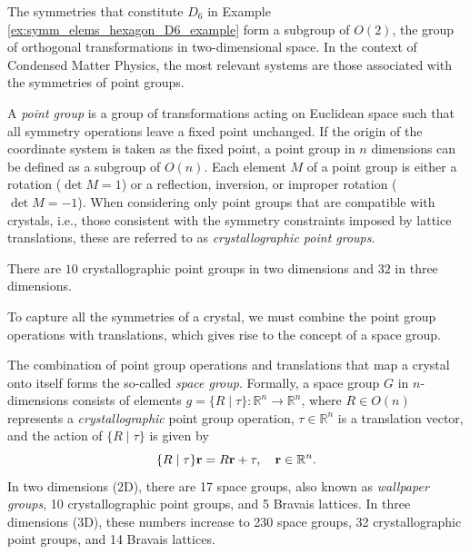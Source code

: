 The symmetries that constitute \(D_6\) in Example \ref{ex:symm_elems_hexagon_D6_example} form a subgroup of \(O(2)\), the group of orthogonal transformations in two-dimensional space. In the context of Condensed Matter Physics, the most relevant systems are those associated with the symmetries of point groups.
\begin{definition} \label{def:point_group}
A \textit{point group} is a group of transformations acting on Euclidean space such that all symmetry operations leave a fixed point unchanged. If the origin of the coordinate system is taken as the fixed point, a point group in \(n\) dimensions can be defined as a subgroup of \(O(n)\). Each element \(M\) of a point group is either a rotation (\(\det M = 1\)) or a reflection, inversion, or improper rotation (\(\det M = -1\)). When considering only point groups that are compatible with crystals, i.e., those consistent with the symmetry constraints imposed by lattice translations, these are referred to as \textit{crystallographic point groups}.

There are $10$ crystallographic point groups in two dimensions and $32$ in three dimensions.
\end{definition}

To capture all the symmetries of a crystal, we must combine the point group operations with translations, which gives rise to the concept of a space group.

\begin{definition} \label{def:space_group}
The combination of point group operations and translations that map a crystal onto itself forms the so-called \textit{space group}. Formally, a space group \(G\) in \(n\)-dimensions consists of elements \(g = \{R \mid \tau\}: \mathbb{R}^n \to \mathbb{R}^n\), where \(R \in O(n)\) represents a \textit{crystallographic} point group operation, \(\tau \in \mathbb{R}^n\) is a translation vector, and the action of $\{R \mid \tau\}$ is given by
\begin{equation} \label{eq:space_group_action_def}
\{R \mid \tau\} {\vb{r}} = R {\vb{r}} + \tau, \quad {\vb{r}} \in \mathbb{R}^n.
\end{equation}
In two dimensions (2D), there are 17 space groups, also known as \textit{wallpaper groups}, 10 crystallographic point groups, and 5 Bravais lattices. In three dimensions (3D), these numbers increase to 230 space groups, 32 crystallographic point groups, and 14 Bravais lattices.
\end{definition}



